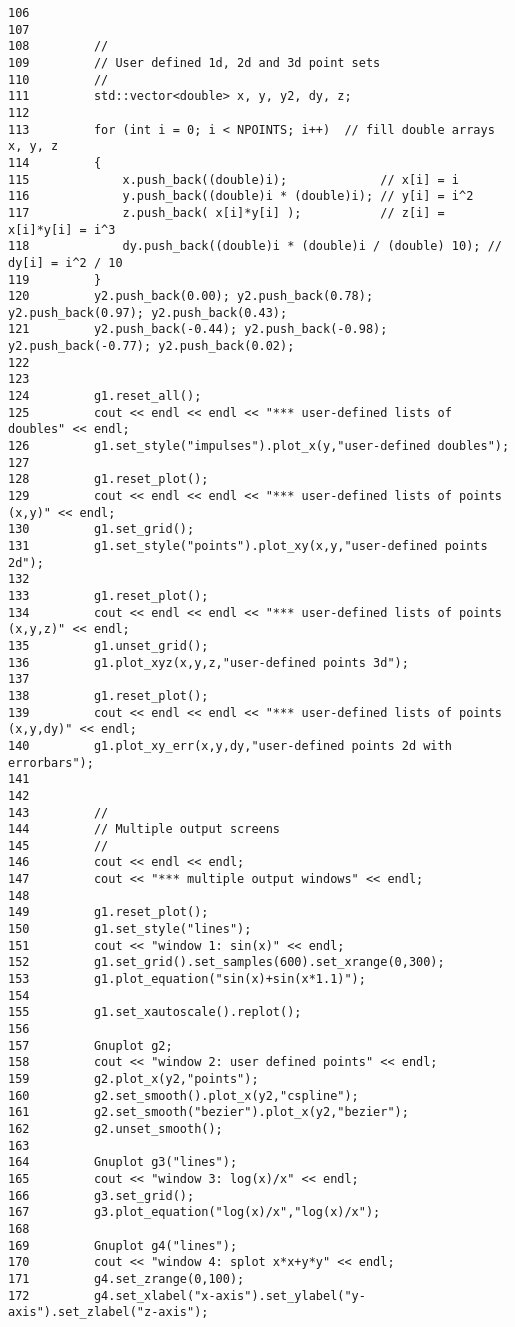 \begin{Code}
\begin{verbatim}
106 
107 
108         //
109         // User defined 1d, 2d and 3d point sets
110         //
111         std::vector<double> x, y, y2, dy, z;
112 
113         for (int i = 0; i < NPOINTS; i++)  // fill double arrays x, y, z
114         {
115             x.push_back((double)i);             // x[i] = i
116             y.push_back((double)i * (double)i); // y[i] = i^2
117             z.push_back( x[i]*y[i] );           // z[i] = x[i]*y[i] = i^3
118             dy.push_back((double)i * (double)i / (double) 10); // dy[i] = i^2 / 10
119         }
120         y2.push_back(0.00); y2.push_back(0.78); y2.push_back(0.97); y2.push_back(0.43);
121         y2.push_back(-0.44); y2.push_back(-0.98); y2.push_back(-0.77); y2.push_back(0.02);
122 
123 
124         g1.reset_all();
125         cout << endl << endl << "*** user-defined lists of doubles" << endl;
126         g1.set_style("impulses").plot_x(y,"user-defined doubles");
127 
128         g1.reset_plot();
129         cout << endl << endl << "*** user-defined lists of points (x,y)" << endl;
130         g1.set_grid();
131         g1.set_style("points").plot_xy(x,y,"user-defined points 2d");
132 
133         g1.reset_plot();
134         cout << endl << endl << "*** user-defined lists of points (x,y,z)" << endl;
135         g1.unset_grid();
136         g1.plot_xyz(x,y,z,"user-defined points 3d");
137 
138         g1.reset_plot();
139         cout << endl << endl << "*** user-defined lists of points (x,y,dy)" << endl;
140         g1.plot_xy_err(x,y,dy,"user-defined points 2d with errorbars");
141 
142 
143         //
144         // Multiple output screens
145         //
146         cout << endl << endl;
147         cout << "*** multiple output windows" << endl;
148 
149         g1.reset_plot();
150         g1.set_style("lines");
151         cout << "window 1: sin(x)" << endl;
152         g1.set_grid().set_samples(600).set_xrange(0,300);
153         g1.plot_equation("sin(x)+sin(x*1.1)");
154 
155         g1.set_xautoscale().replot();
156 
157         Gnuplot g2;
158         cout << "window 2: user defined points" << endl;
159         g2.plot_x(y2,"points");
160         g2.set_smooth().plot_x(y2,"cspline");
161         g2.set_smooth("bezier").plot_x(y2,"bezier");
162         g2.unset_smooth();
163 
164         Gnuplot g3("lines");
165         cout << "window 3: log(x)/x" << endl;
166         g3.set_grid();
167         g3.plot_equation("log(x)/x","log(x)/x");
168 
169         Gnuplot g4("lines");
170         cout << "window 4: splot x*x+y*y" << endl;
171         g4.set_zrange(0,100);
172         g4.set_xlabel("x-axis").set_ylabel("y-axis").set_zlabel("z-axis");

\end{verbatim}
\end{Code}
